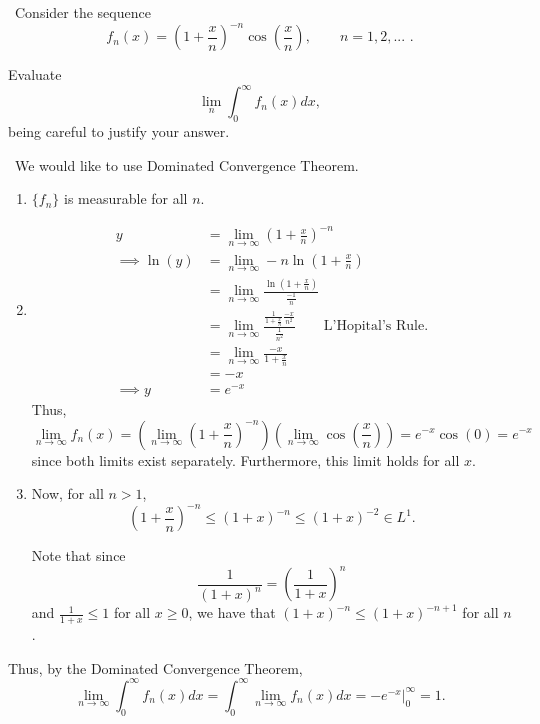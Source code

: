 \documentclass[12pt]{Qual}
\begin{document}
\begin{problem} $\,$
Consider the sequence $$f_n(x)=\left(1+\frac{x}{n}\right)^{-n}\cos\left(\frac{x}{n}\right),\qquad n=1,2,...\,\,.$$

Evaluate $$\lim_n\int_0^\infty f_n(x)dx,$$ being careful to justify your answer.
\end{problem}


\begin{solution}$\,$
We would like to use Dominated Convergence Theorem.
\begin{enumerate}
    \item $\{f_n\}$ is measurable for all $n$.
    \item \begin{align*}
        y&=\lim_{n\to\infty}\left(1+\frac{x}{n}\right)^{-n}\\
        \implies \ln(y)&=\lim_{n\to\infty}-n\ln\left(1+\frac{x}{n}\right)\\
        &=\lim_{n\to\infty}\frac{\ln\left(1+\frac{x}{n}\right)}{\frac{-1}{n}}\\
        &=\lim_{n\to\infty}\frac{\frac{1}{1+\frac{x}{n}}\frac{-x}{n^2}}{\frac{1}{n^2}}\qquad\text{L'Hopital's Rule.}\\
        &=\lim_{n\to\infty}\frac{-x}{1+\frac{x}{n}}\\
        &=-x\\
        \implies y&=e^{-x}
    \end{align*}
    Thus, $$\lim_{n\to\infty}f_n(x)=\left(\lim_{n\to\infty}\left(1+\frac{x}{n}\right)^{-n}\right)\left(\lim_{n\to\infty}\cos\left(\frac{x}{n}\right)\right)=e^{-x}\cos(0)=e^{-x}$$ since both limits exist separately. Furthermore, this limit holds for all $x$.
    \item Now, for all $n>1$, $$\left(1+\frac{x}{n}\right)^{-n}\le\left(1+x\right)^{-n}\le(1+x)^{-2}\in L^1.$$

    Note that since $$\frac{1}{(1+x)^n}=\left(\frac{1}{1+x}\right)^n$$ and $\frac{1}{1+x}\le 1$ for all $x\ge0$, we have that $(1+x)^{-n}\le(1+x)^{-n+1}$ for all $n$.
\end{enumerate}

Thus, by the Dominated Convergence Theorem, $$\lim_{n\to\infty}\int_0^\infty f_n(x)dx=\int_0^\infty\lim_{n\to\infty}f_n(x)dx=-e^{-x}\bigg|_0^\infty=1.$$
\begin{comment}

    Now, using calculus, we let $g(x)=-n\ln\left(1+\frac{x}{n}\right)+x$. Since $x\ge0$, for all $n>1$, we have that $$\frac{d}{dx}g(x)=\frac{d}{dx}\left(-n\ln\left(1+\frac{x}{n}\right)+x\right)=\frac{-n}{n+x}+k=\frac{(k-1)n+x}{n+x}\ge0$$ and since $g(0)=0$, we have that $g(x)\ge0$ for all $x\ge0$ and so $$-n\ln\left(1+\frac{x}{n}\right)\ge -x\implies \left(1+\frac{x}{n}\right)^{-n}\ge e^{-x}.$$

    Finally, This implies that

    $$f_n(x)\le \left(1+\frac{x}{n}\right)^{-n}\le e^{-x}\in L^1([0,\infty)).$$
    \begin{center}
    \texttt{[image: hw/Qual1.jpg]}
\end{center}
\end{comment}
\end{solution}
\newpage
\end{document}
